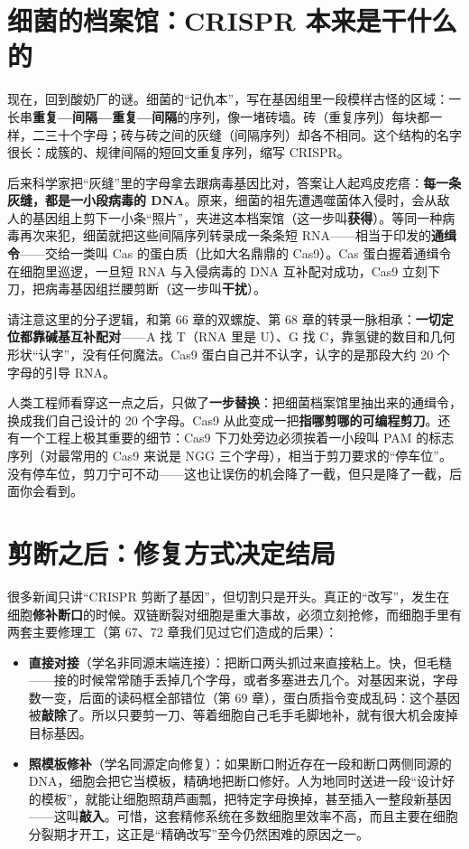\section{细菌的档案馆：CRISPR 本来是干什么的}

现在，回到酸奶厂的谜。细菌的“记仇本”，写在基因组里一段模样古怪的区域：一长串\textbf{重复—间隔—重复—间隔}的序列，像一堵砖墙。砖（重复序列）每块都一样，二三十个字母；砖与砖之间的灰缝（间隔序列）却各不相同。这个结构的名字很长：成簇的、规律间隔的短回文重复序列，缩写 CRISPR。

后来科学家把“灰缝”里的字母拿去跟病毒基因比对，答案让人起鸡皮疙瘩：\textbf{每一条灰缝，都是一小段病毒的 DNA}。原来，细菌的祖先遭遇噬菌体入侵时，会从敌人的基因组上剪下一小条“照片”，夹进这本档案馆（这一步叫\textbf{获得}）。等同一种病毒再次来犯，细菌就把这些间隔序列转录成一条条短 RNA——相当于印发的\textbf{通缉令}——交给一类叫 Cas 的蛋白质（比如大名鼎鼎的 Cas9）。Cas 蛋白握着通缉令在细胞里巡逻，一旦短 RNA 与入侵病毒的 DNA 互补配对成功，Cas9 立刻下刀，把病毒基因组拦腰剪断（这一步叫\textbf{干扰}）。

请注意这里的分子逻辑，和第 66 章的双螺旋、第 68 章的转录一脉相承：\textbf{一切定位都靠碱基互补配对}——A 找 T（RNA 里是 U）、G 找 C，靠氢键的数目和几何形状“认字”，没有任何魔法。Cas9 蛋白自己并不认字，认字的是那段大约 20 个字母的引导 RNA。

人类工程师看穿这一点之后，只做了\textbf{一步替换}：把细菌档案馆里抽出来的通缉令，换成我们自己设计的 20 个字母。Cas9 从此变成一把\textbf{指哪剪哪的可编程剪刀}。还有一个工程上极其重要的细节：Cas9 下刀处旁边必须挨着一小段叫 PAM 的标志序列（对最常用的 Cas9 来说是 NGG 三个字母），相当于剪刀要求的“停车位”。没有停车位，剪刀宁可不动——这也让误伤的机会降了一截，但只是降了一截，后面你会看到。

\section{剪断之后：修复方式决定结局}

很多新闻只讲“CRISPR 剪断了基因”，但切割只是开头。真正的“改写”，发生在细胞\textbf{修补断口}的时候。双链断裂对细胞是重大事故，必须立刻抢修，而细胞手里有两套主要修理工（第 67、72 章我们见过它们造成的后果）：

\begin{itemize}[itemsep=2pt]
\item \textbf{直接对接}（学名非同源末端连接）：把断口两头抓过来直接粘上。快，但毛糙——接的时候常常随手丢掉几个字母，或者多塞进去几个。对基因来说，字母数一变，后面的读码框全部错位（第 69 章），蛋白质指令变成乱码：这个基因被\textbf{敲除}了。所以只要剪一刀、等着细胞自己毛手毛脚地补，就有很大机会废掉目标基因。
\item \textbf{照模板修补}（学名同源定向修复）：如果断口附近存在一段和断口两侧同源的 DNA，细胞会把它当模板，精确地把断口修好。人为地同时送进一段“设计好的模板”，就能让细胞照葫芦画瓢，把特定字母换掉，甚至插入一整段新基因——这叫\textbf{敲入}。可惜，这套精修系统在多数细胞里效率不高，而且主要在细胞分裂期才开工，这正是“精确改写”至今仍然困难的原因之一。
\end{itemize}

